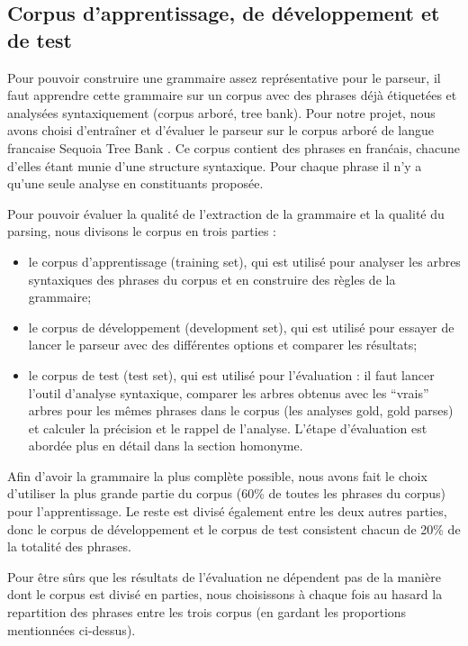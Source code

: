 \documentclass[12pt]{article}
\begin{document}
\subsection{Corpus d'apprentissage, de d\'eveloppement et de test}
Pour pouvoir construire une grammaire assez repr\'esentative pour le parseur, il
faut apprendre cette grammaire sur un corpus avec des phrases d\'ej\`a
\'etiquet\'ees et analys\'ees syntaxiquement (corpus arbor\'e, tree bank). Pour notre projet, nous
avons choisi d'entra\^iner et d'\'evaluer le parseur sur le corpus arbor\'e de
langue francaise Sequoia Tree Bank \cite{Sequoia}. Ce corpus contient des
phrases en fran\'cais, chacune d'elles \'etant munie d'une structure syntaxique.
Pour chaque phrase il n'y a qu'une seule analyse en constituants propos\'ee.\par

Pour pouvoir \'evaluer la qualit\'e de l'extraction de la grammaire et la qualit\'e du
parsing, nous divisons le corpus en trois parties :
\begin{itemize}
  \item le corpus d'apprentissage (training set), qui est utilis\'e pour analyser
  les arbres syntaxiques des phrases du corpus et en construire des r\`egles de la
  grammaire;
  \item le corpus de d\'eveloppement (development set), qui est utilis\'e pour
  essayer de lancer le parseur avec des diff\'erentes options et comparer les
  r\'esultats;
  \item le corpus de test (test set), qui est utilis\'e pour l'\'evaluation :
  il faut lancer l'outil d'analyse syntaxique, comparer les arbres obtenus avec les ``vrais'' arbres
  pour les m\^emes phrases dans le corpus (les analyses gold, gold parses) et
  calculer la pr\'ecision et le rappel de l'analyse.
  L'\'etape d'\'evaluation est abord\'ee plus en d\'etail dans la section homonyme.
\end{itemize}

Afin d'avoir la grammaire la plus compl\`ete possible, nous avons fait le choix
d'utiliser la plus grande partie du corpus (60\% de toutes les phrases du
corpus) pour l'apprentissage. Le reste est divis\'e \'egalement entre les deux
autres parties, donc le corpus de d\'eveloppement et le corpus de test consistent
chacun de 20\% de la totalit\'e des phrases. \par

Pour \^etre s\^urs que les r\'esultats de l'\'evaluation ne d\'ependent pas de la mani\`ere
dont le corpus est divis\'e en parties, nous choisissons \`a chaque fois au hasard
la repartition des phrases entre les trois corpus (en gardant les proportions mentionn\'ees
ci-dessus).
\end{document}
